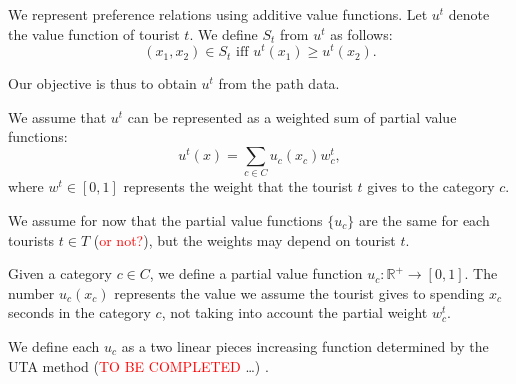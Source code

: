 \documentclass[version=last, pagesize, twoside=semi, DIV=calc, 12pt, a4paper, french, english]{scrartcl}
\begin{document}
We represent preference relations using additive value functions. Let $u^t$ denote the value function of tourist $t$. We define $S_t$ from  $u^t$ as follows:
\begin{equation}
(x_1,x_2) \in S_t \text { iff } u^t(x_1) \geq u^t(x_2).
\end{equation}

Our objective is thus to obtain $u^t$ from the path data.

We assume that $u^t$ can be represented as a weighted sum  of partial value functions:
\begin{equation}
u^t(x) = \sum_{c \in C} u_c(x_c) w^t_c,
\end{equation}
where $w^t \in [0,1]$ represents the weight that the tourist $t$ gives to the category $c$.

We assume for now that the partial value functions $\{u_c\}$ are the same for each tourists $t \in T$ (\textcolor{red}{or not?}), but the weights may depend on tourist $t$.

Given a category $c \in C$, we define a partial value function $u_c:{\mathbb{R}^+} \rightarrow [0,1]$. The number $u_c(x_c)$ represents the value we assume the tourist gives to spending $x_c$ seconds in the category $c$, not taking into account the partial weight $w^t_c$.

We define each $u_c$ as a two linear pieces increasing function determined by the UTA method (\textcolor{red}{TO BE COMPLETED} \dots) .
\end{document}
